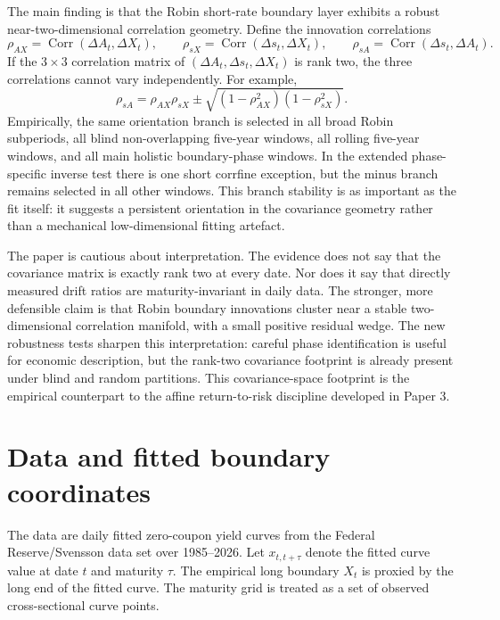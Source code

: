 \documentclass[11pt]{article}
\newcommand{\Corr}{\operatorname{Corr}}
\begin{document}
The main finding is that the Robin short-rate boundary layer exhibits a robust near-two-dimensional correlation geometry. Define the innovation correlations
\begin{equation}
 \rho_{AX}=\Corr(\Delta A_t,\Delta X_t),\qquad
 \rho_{sX}=\Corr(\Delta s_t,\Delta X_t),\qquad
 \rho_{sA}=\Corr(\Delta s_t,\Delta A_t).
\end{equation}
If the $3\times3$ correlation matrix of $(\Delta A_t,\Delta s_t,\Delta X_t)$ is rank two, the three correlations cannot vary independently. For example,
\begin{equation}
\rho_{sA}
=
\rho_{AX}\rho_{sX}
\pm
\sqrt{(1-\rho_{AX}^{2})(1-\rho_{sX}^{2})}.
\label{eq:intro_triangle}
\end{equation}
Empirically, the same orientation branch is selected in all broad Robin subperiods, all blind non-overlapping five-year windows, all rolling five-year windows, and all main holistic boundary-phase windows. In the extended phase-specific inverse test there is one short corrfine exception, but the minus branch remains selected in all other windows. This branch stability is as important as the fit itself: it suggests a persistent orientation in the covariance geometry rather than a mechanical low-dimensional fitting artefact.

The paper is cautious about interpretation. The evidence does not say that the covariance matrix is exactly rank two at every date. Nor does it say that directly measured drift ratios are maturity-invariant in daily data. The stronger, more defensible claim is that Robin boundary innovations cluster near a stable two-dimensional correlation manifold, with a small positive residual wedge. The new robustness tests sharpen this interpretation: careful phase identification is useful for economic description, but the rank-two covariance footprint is already present under blind and random partitions. This covariance-space footprint is the empirical counterpart to the affine return-to-risk discipline developed in Paper 3.

\section{Data and fitted boundary coordinates}

The data are daily fitted zero-coupon yield curves from the Federal Reserve/Svensson data set over 1985--2026. Let $x_{t,t+\tau}$ denote the fitted curve value at date $t$ and maturity $\tau$. The empirical long boundary $X_t$ is proxied by the long end of the fitted curve. The maturity grid is treated as a set of observed cross-sectional curve points.
\end{document}
